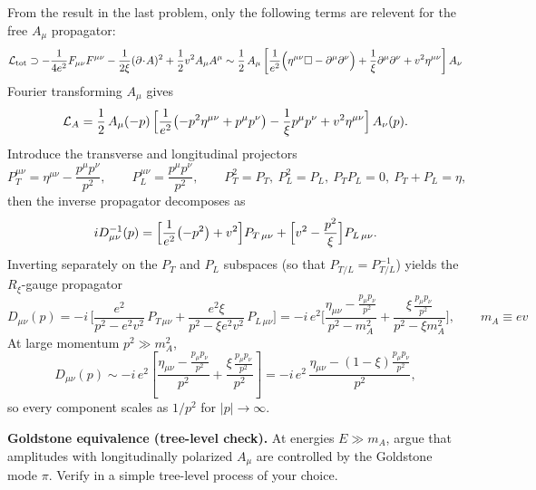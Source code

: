 \begin{solution}[23.4]
	From the result in the last problem, only the following terms are relevent for the free $A_\mu$ propagator:
	\[
		\mathcal{L}_{\text{tot}}\supset -\frac{1}{4e^{2}}F_{\mu\nu}F^{\mu\nu}-\frac{1}{2\xi}(\partial\!\cdot\! A)^{2}
		+\frac{1}{2}v^{2}A_{\mu}A^{\mu}
		\sim\frac12\,A_\mu\left[\frac{1}{e^2}\Bigl(\eta^{\mu\nu}\Box-\partial^\mu\partial^\nu\Bigr)+\frac{1}{\xi}\partial^\mu\partial^\nu+v^2\eta^{\mu\nu}\right]A_\nu
	\]
	Fourier transforming $A_\mu$ gives
	\[
	\mathcal L_{A}
	=\frac12\,A_\mu(-p)\,\Bigl[\frac{1}{e^2}\bigl(-p^2\eta^{\mu\nu}+p^\mu p^\nu\bigr)-\frac{1}{\xi}p^\mu p^\nu+v^2\eta^{\mu\nu}\Bigr]\,A_\nu(p).
	\]
	Introduce the transverse and longitudinal projectors
	\[
	P_T^{\mu\nu}=\eta^{\mu\nu}-\frac{p^\mu p^\nu}{p^2},\qquad
	P_L^{\mu\nu}=\frac{p^\mu p^\nu}{p^2},\qquad
	P_T^2=P_T,\ P_L^2=P_L,\ P_TP_L=0,\ P_T+P_L=\eta,
	\]
	then the inverse propagator decomposes as
	\[
	iD^{-1}_{\mu\nu}(p)
	=\Bigl[\frac{1}{e^2}\bigl(-p^2\bigr)+v^2\Bigr]P_{T\,\mu\nu}
	+\Bigl[v^2-\frac{p^2}{\xi}\Bigr]P_{L\,\mu\nu}.
	\]
	Inverting separately on the $P_T$ and $P_L$ subspaces (so that $P_{T/L}=P^{-1}_{T/L}$) yields the $R_\xi$-gauge propagator
	\[
	\boxed{
	D_{\mu\nu}(p)
	= -i\,\Biggl[
	\frac{e^2}{p^2-e^2v^2}\,P_{T\,\mu\nu}
	+\frac{e^2\xi}{p^2-\xi e^2v^2}\,P_{L\,\mu\nu}
	\Biggr]
	= -i\,e^2\Biggl[
	\frac{\eta_{\mu\nu}-\frac{p_\mu p_\nu}{p^2}}{p^2-m_A^2}
	+\frac{\xi\,\frac{p_\mu p_\nu}{p^2}}{p^2-\xi m_A^2}
	\Biggr],
	\qquad m_A\equiv ev
}
	\]
	At large momentum $p^2\gg m_A^2$,
	\[
	D_{\mu\nu}(p)
	\sim -i\,e^2\left[
	\frac{\eta_{\mu\nu}-\frac{p_\mu p_\nu}{p^2}}{p^2}
	+\frac{\xi\,\frac{p_\mu p_\nu}{p^2}}{p^2}
	\right]
	= -i\,e^2\,\frac{\eta_{\mu\nu}-(1-\xi)\frac{p_\mu p_\nu}{p^2}}{p^2},
	\]
	so every component scales as $1/p^2$ for $|p|\to\infty$.
	
\end{solution}
\begin{problem}
    \textbf{Goldstone equivalence (tree-level check).} At energies \(E\gg m_A\), argue that amplitudes with longitudinally polarized \(A_\mu\) are controlled by the Goldstone mode \(\pi\). Verify in a simple tree-level process of your choice.
\end{problem}
